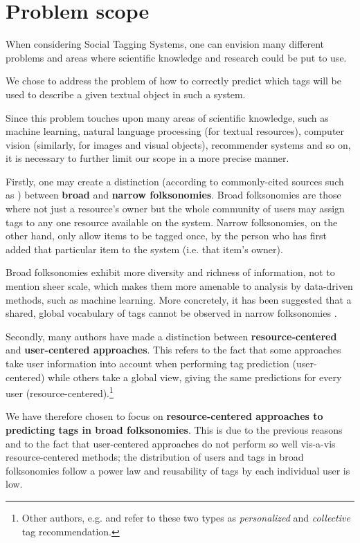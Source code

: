\section{Problem scope}\label{section:intro_problem}

When considering Social Tagging Systems, one can envision many different problems and areas where scientific knowledge and research could be put to use.

We chose to address the problem of how to correctly predict which tags will be used to describe a given textual object in such a system. 

Since this problem touches upon many areas of scientific knowledge, such as machine learning, natural language processing (for textual resources), computer vision (similarly, for images and visual objects), recommender systems and so on, it is necessary to further limit our scope in a more precise manner.

Firstly, one may create a distinction (according to commonly-cited sources such as \cite{wal_2005_broad_and_narrow}) between \textbf{broad} and \textbf{narrow folksonomies}. Broad folksonomies are those where not just a resource's owner but the whole community of users may assign tags to any one resource available on the system. Narrow folksonomies, on the other hand, only allow items to be tagged once, by the person who has first added that particular item to the system (i.e. that item's owner).

Broad folksonomies exhibit more diversity and richness of information, not to mention sheer scale, which makes them more amenable to analysis by data-driven methods, such as machine learning. More concretely, it has been suggested that a shared, global vocabulary of tags cannot be observed in narrow folksonomies \citep{schifanella_etal_2010}.

Secondly, many authors \citep{illig_etal_2011,song_etal_2011} have made a distinction between \textbf{resource-centered} and \textbf{user-centered approaches}. This refers to the fact that some approaches take user information into account when performing tag prediction (user-centered) while others take a global view, giving the same predictions for every user (resource-centered).\footnote{Other authors, e.g. \cite{zhang_etal_2014} and \cite{hu_etal_2010} refer to these two types as \textit{personalized} and \textit{collective} tag recommendation.}

We have therefore chosen to focus on \textbf{resource-centered approaches to predicting tags in broad folksonomies}. This is due to the previous reasons and to the fact \citep{song_etal_2011} that user-centered approaches do not perform so well vis-a-vis resource-centered methods; the distribution of users and tags in broad folksonomies follow a power law and reusability of tags by each individual user is low. 

